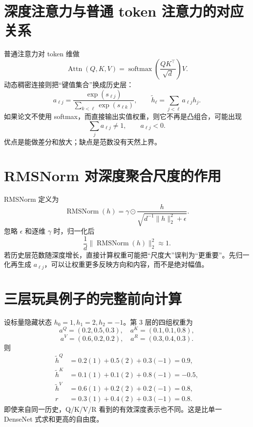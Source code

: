 \documentclass[UTF8,12pt,a4paper,fontset=none]{ctexart}
\numberwithin{equation}{section}
\newcommand{\softmax}{\operatorname{softmax}}
\begin{document}
\section{深度注意力与普通 token 注意力的对应关系}
普通注意力对 token 维做
\begin{equation}
 \operatorname{Attn}(Q,K,V)=\softmax\left(\frac{QK^\top}{\sqrt d}\right)V.
\end{equation}
动态稠密连接则把“键值集合”换成历史层：
\begin{equation}
 a_{\ell j}=\frac{\exp(s_{\ell j})}{\sum_{k<\ell}\exp(s_{\ell k})},
 \qquad
 \widetilde h_\ell=\sum_{j<\ell}a_{\ell j}h_j.
\end{equation}
如果论文不使用 softmax，而直接输出实值权重，则它不再是凸组合，可能出现
\begin{equation}
 \sum_j a_{\ell j}\ne1,
 \qquad a_{\ell j}<0.
\end{equation}
优点是能做差分和放大；缺点是范数没有天然上界。

\section{RMSNorm 对深度聚合尺度的作用}
RMSNorm 定义为
\begin{equation}
 \operatorname{RMSNorm}(h)=
 \gamma\odot\frac{h}{\sqrt{d^{-1}\|h\|_2^2+\epsilon}}.
\end{equation}
忽略 $\epsilon$ 和逐维 $\gamma$ 时，归一化后
\begin{equation}
 \frac1d\|\operatorname{RMSNorm}(h)\|_2^2\approx1.
\end{equation}
若历史层范数随深度增长，直接计算权重可能把“尺度大”误判为“更重要”。先归一化再生成 $a_{\ell j}$，可以让权重更多反映方向和内容，而不是绝对幅值。

\section{三层玩具例子的完整前向计算}
设标量隐藏状态 $h_0=1,h_1=2,h_2=-1$。第 3 层的四组权重为
\begin{equation}
 a^Q=(0.2,0.5,0.3),\quad
 a^K=(0.1,0.1,0.8),
\end{equation}
\begin{equation}
 a^V=(0.6,0.2,0.2),\quad
 a^R=(0.3,0.4,0.3).
\end{equation}
则
\begin{align}
 \widetilde h^Q&=0.2(1)+0.5(2)+0.3(-1)=0.9,\\
 \widetilde h^K&=0.1(1)+0.1(2)+0.8(-1)=-0.5,\\
 \widetilde h^V&=0.6(1)+0.2(2)+0.2(-1)=0.8,\\
 r&=0.3(1)+0.4(2)+0.3(-1)=0.8.
\end{align}
即使来自同一历史，Q/K/V/R 看到的有效深度表示也不同。这是比单一 DenseNet 式求和更高的自由度。
\end{document}
